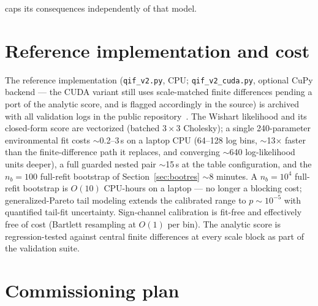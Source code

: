 \documentclass[11pt]{article}
\begin{document}
caps its consequences independently of that model.

\section{Reference implementation and cost}
\label{sec:implementation}

The reference implementation (\texttt{qif\_v2.py}, CPU; \texttt{qif\_v2\_cuda.py}, optional CuPy backend --- the CUDA variant still uses scale-matched finite differences pending a port of the analytic score, and is flagged accordingly in the source) is archived with all validation logs in the public repository~\cite{repo}. The Wishart likelihood and its closed-form score are vectorized (batched $3\times3$ Cholesky); a single 240-parameter environmental fit costs $\sim$0.2--3\,s on a laptop CPU (64--128 log bins, $\sim$13$\times$ faster than the finite-difference path it replaces, and converging $\sim$640 log-likelihood units deeper), a full guarded nested pair $\sim$15\,s at the table configuration, and the $n_b = 100$ full-refit bootstrap of Section~\ref{sec:bootres} $\sim$8 minutes. A $n_b = 10^4$ full-refit bootstrap is $O(10)$ CPU-hours on a laptop --- no longer a blocking cost; generalized-Pareto tail modeling extends the calibrated range to $p \sim 10^{-5}$ with quantified tail-fit uncertainty. Sign-channel calibration is fit-free and effectively free of cost (Bartlett resampling at $O(1)$ per bin). The analytic score is regression-tested against central finite differences at every scale block as part of the validation suite.

\section{Commissioning plan}
\label{sec:plan}
\end{document}
